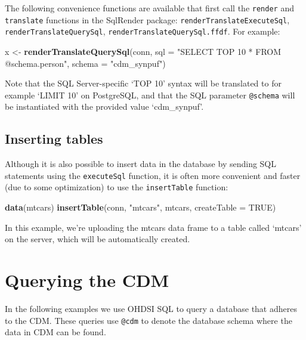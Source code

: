 \documentclass[11pt]{book}
\newenvironment{Shaded}{\begin{snugshade}}{\end{snugshade}}
\newcommand{\DataTypeTok}[1]{\textcolor[rgb]{0.13,0.29,0.53}{#1}}
\newcommand{\KeywordTok}[1]{\textcolor[rgb]{0.13,0.29,0.53}{\textbf{#1}}}
\newcommand{\NormalTok}[1]{#1}
\newcommand{\OtherTok}[1]{\textcolor[rgb]{0.56,0.35,0.01}{#1}}
\newcommand{\StringTok}[1]{\textcolor[rgb]{0.31,0.60,0.02}{#1}}
\theoremstyle{definition}
\theoremstyle{definition}
\theoremstyle{definition}
\theoremstyle{remark}
\begin{document}
The following convenience functions are available that first call the \texttt{render} and \texttt{translate} functions in the SqlRender package: \texttt{renderTranslateExecuteSql}, \texttt{renderTranslateQuerySql}, \texttt{renderTranslateQuerySql.ffdf}. For example:

\begin{Shaded}
\begin{Highlighting}[]
\NormalTok{x <-}\StringTok{ }\KeywordTok{renderTranslateQuerySql}\NormalTok{(conn, }
                             \DataTypeTok{sql =} \StringTok{"SELECT TOP 10 * FROM @schema.person"}\NormalTok{,}
                             \DataTypeTok{schema =} \StringTok{"cdm_synpuf"}\NormalTok{)}
\end{Highlighting}
\end{Shaded}

Note that the SQL Server-specific `TOP 10' syntax will be translated to for example `LIMIT 10' on PostgreSQL, and that the SQL parameter \texttt{@schema} will be instantiated with the provided value `cdm\_synpuf'.

\hypertarget{inserting-tables}{%
\subsection{Inserting tables}\label{inserting-tables}}

Although it is also possible to insert data in the database by sending SQL statements using the \texttt{executeSql} function, it is often more convenient and faster (due to some optimization) to use the \texttt{insertTable} function:

\begin{Shaded}
\begin{Highlighting}[]
\KeywordTok{data}\NormalTok{(mtcars)}
\KeywordTok{insertTable}\NormalTok{(conn, }\StringTok{"mtcars"}\NormalTok{, mtcars, }\DataTypeTok{createTable =} \OtherTok{TRUE}\NormalTok{)}
\end{Highlighting}
\end{Shaded}

In this example, we're uploading the mtcars data frame to a table called `mtcars' on the server, which will be automatically created.

\hypertarget{QueryTheCdm}{%
\section{Querying the CDM}\label{QueryTheCdm}}

In the following examples we use OHDSI SQL to query a database that adheres to the CDM. These queries use \texttt{@cdm} to denote the database schema where the data in CDM can be found.
\end{document}

